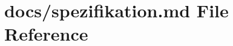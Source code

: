 \hypertarget{spezifikation_8md}{}\section{docs/spezifikation.md File Reference}
\label{spezifikation_8md}
